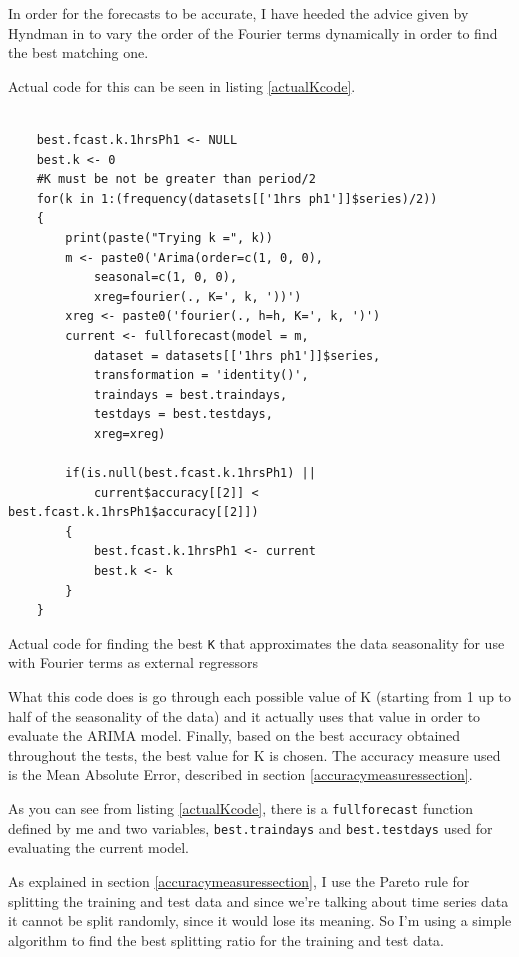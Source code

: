\documentclass[12pt,a4paper,titlepage]{report}
\begin{document}
In order for the forecasts to be accurate, I have heeded the advice given by Hyndman in \cite{fpp2dhr} to vary the order of the Fourier terms dynamically in order to find the best matching one.

Actual code for this can be seen in listing \ref{actualKcode}.

\begin{listing}[h]
\begin{verbatim}

    best.fcast.k.1hrsPh1 <- NULL
    best.k <- 0
    #K must be not be greater than period/2
    for(k in 1:(frequency(datasets[['1hrs ph1']]$series)/2))
    {
        print(paste("Trying k =", k))
        m <- paste0('Arima(order=c(1, 0, 0),
            seasonal=c(1, 0, 0),
            xreg=fourier(., K=', k, '))')
        xreg <- paste0('fourier(., h=h, K=', k, ')')
        current <- fullforecast(model = m,
            dataset = datasets[['1hrs ph1']]$series,
            transformation = 'identity()',
            traindays = best.traindays,
            testdays = best.testdays,
            xreg=xreg)
        
        if(is.null(best.fcast.k.1hrsPh1) || 
            current$accuracy[[2]] < best.fcast.k.1hrsPh1$accuracy[[2]])
        {
            best.fcast.k.1hrsPh1 <- current
            best.k <- k
        }
    }
\end{verbatim}

\caption{Actual code for finding the best \texttt{K} that approximates the data seasonality for use with Fourier terms as external regressors}
\label{actualKcode}
\end{listing}

What this code does is go through each possible value of K (starting from 1 up to half of the seasonality of the data) and it actually uses that value in order to evaluate the ARIMA model. Finally, based on the best accuracy obtained throughout the tests, the best value for K is chosen.
The accuracy measure used is the Mean Absolute Error, described in section \ref{accuracymeasuressection}.

As you can see from listing \ref{actualKcode}, there is a \texttt{fullforecast} function defined by me and two variables, \texttt{best.traindays} and \texttt{best.testdays} used for evaluating the current model.

As explained in section \ref{accuracymeasuressection}, I use the Pareto rule for splitting the training and test data and since we're talking about time series data it cannot be split randomly, since it would lose its meaning. So I'm using a simple algorithm to find the best splitting ratio for the training and test data. 
\end{document}
